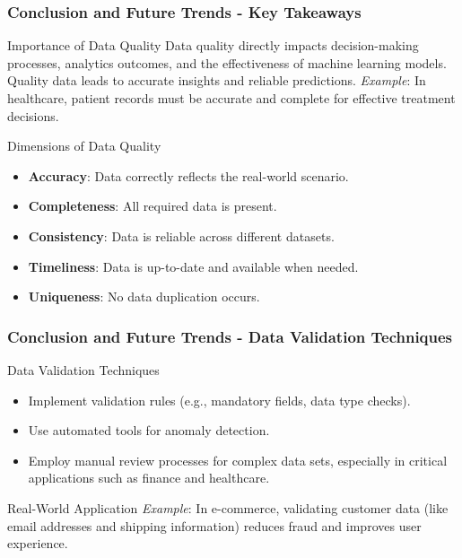 \documentclass[aspectratio=169]{beamer}
\begin{document}
\begin{frame}[fragile]
    \frametitle{Conclusion and Future Trends - Key Takeaways}
    
    \begin{block}{Importance of Data Quality}
        Data quality directly impacts decision-making processes, analytics outcomes, and the effectiveness of machine learning models. 
        Quality data leads to accurate insights and reliable predictions. 
        \textit{Example}: In healthcare, patient records must be accurate and complete for effective treatment decisions.
    \end{block}

    \begin{block}{Dimensions of Data Quality}
        \begin{itemize}
            \item \textbf{Accuracy}: Data correctly reflects the real-world scenario.
            \item \textbf{Completeness}: All required data is present.
            \item \textbf{Consistency}: Data is reliable across different datasets.
            \item \textbf{Timeliness}: Data is up-to-date and available when needed.
            \item \textbf{Uniqueness}: No data duplication occurs.
        \end{itemize}
    \end{block}
\end{frame}

\begin{frame}[fragile]
    \frametitle{Conclusion and Future Trends - Data Validation Techniques}

    \begin{block}{Data Validation Techniques}
        \begin{itemize}
            \item Implement validation rules (e.g., mandatory fields, data type checks).
            \item Use automated tools for anomaly detection.
            \item Employ manual review processes for complex data sets, especially in critical applications such as finance and healthcare.
        \end{itemize}
    \end{block}

    \begin{block}{Real-World Application}
        \textit{Example}: In e-commerce, validating customer data (like email addresses and shipping information) reduces fraud and improves user experience.
    \end{block}
\end{frame}
\end{document}
